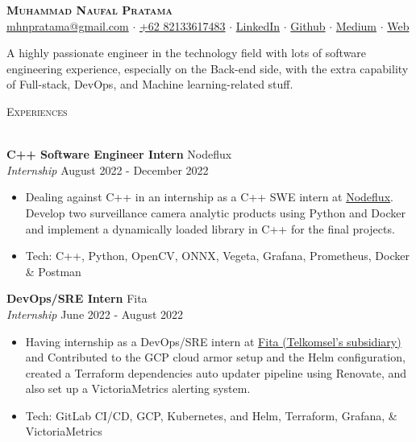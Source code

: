 \documentclass[a4paper]{article}
\newcommand{\lineunder} {
    \vspace*{-8pt} \\
    \hspace*{-18pt} \hrulefill \\
}
\newcommand{\header} [1] {
    {\hspace*{-18pt}\vspace*{6pt} \textsc{#1}}
    \vspace*{-6pt} \lineunder
}
\begin{document}
\vspace*{-40pt}

\vspace*{-10pt}
\begin{center}
	{\Huge \scshape \textbf{Muhammad Naufal Pratama}}\\
	\href{mailto:mhnpratama@gmail.com}{mhnpratama@gmail.com} $\cdot$ \href{https://wa.me/6282133617483}{+62 82133617483} $\cdot$ \href{https://linkedin.com/in/mnpratamaa}{LinkedIn} $\cdot$ \href{https://github.com/mhnaufal}{Github} $\cdot$ \href{https://medium.com/@mprtmma}{Medium} $\cdot$ \href{https://mhnaufal.github.io/}{Web}\\
\end{center}

A highly passionate engineer in the technology field with lots of software engineering experience, especially on the Back-end side, with the extra capability of Full-stack, DevOps, and Machine learning-related stuff.\\
\hfill \break

\header{Experiences}
\vspace{1mm}

\textbf{C++ Software Engineer Intern} \hfill Nodeflux\\
\textit{Internship} \hfill August 2022 - December 2022\\
\vspace{-1mm}
\begin{itemize} \itemsep 1pt
	\item Dealing against C++ in an internship as a C++ SWE intern at \href{https://www.nodeflux.io/}{Nodeflux}. Develop two surveillance camera analytic products using Python and Docker and implement a dynamically loaded library in C++ for the final projects.
	\item Tech: C++, Python, OpenCV, ONNX, Vegeta, Grafana, Prometheus, Docker \& Postman
\end{itemize}

\textbf{DevOps/SRE Intern} \hfill Fita\\
\textit{Internship} \hfill June 2022 - August 2022\\
\vspace{-1mm}
\begin{itemize} \itemsep 1pt
	\item Having internship as a DevOps/SRE intern at \href{https://fita.co.id/}{Fita (Telkomsel's subsidiary)} and Contributed to the GCP cloud armor setup and the Helm configuration, created a Terraform dependencies auto updater pipeline using Renovate, and also set up a VictoriaMetrics alerting system.
	\item Tech: GitLab CI/CD, GCP, Kubernetes, and Helm, Terraform, Grafana, \& VictoriaMetrics
\end{itemize}
\end{document}
